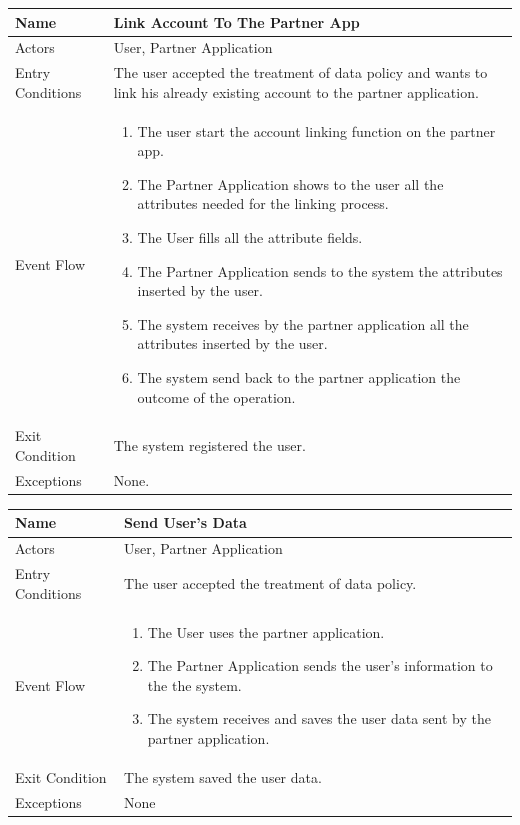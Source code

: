 \begin{enumerate}
\FloatBarrier
\begin{table}[h]
\begin{tabular}{|l|p{}|}
\hline
Name             & Link Account To The Partner App\\ \hline
Actors           & User, Partner Application  \\ \hline
Entry Conditions & The user accepted the treatment of data policy and wants to link his already existing account to the partner application.  \\ \hline
Event Flow       & \begin{enumerate}
			\item The user start the account linking function on the partner app.
			\item The Partner Application shows to the user all the attributes needed for the linking process.
            \item The User fills all the attribute fields.
            \item The Partner Application sends to the system the attributes inserted by the user.
            \item The system receives by the partner application all the attributes inserted by the user.
            \item The system send back to the partner application the outcome of the operation. 
        \end{enumerate}\\ \hline
Exit Condition   & The system registered the user.\\ \hline
Exceptions       & None.\\ \hline
\end{tabular}
\end{table}
\FloatBarrier


\FloatBarrier
\begin{table}[h]
\begin{tabular}{|l|p{}|}
\hline
Name             & Send User's Data\\ \hline
Actors           & User, Partner Application  \\ \hline
Entry Conditions & The user accepted the treatment of data policy.  \\ \hline
Event Flow       & \begin{enumerate}
            \item The User uses the partner application.
            \item The Partner Application sends the user's information to the the system.
            \item The system receives and saves the user data sent by the partner application.
        \end{enumerate}\\ \hline
Exit Condition   & The system saved the user data.\\ \hline
Exceptions       & None \\ \hline
\end{tabular}
\end{table}
\FloatBarrier


\end{enumerate}
